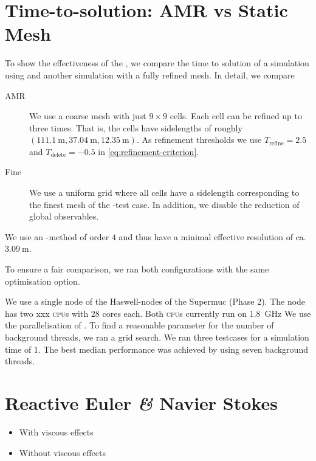 \section{Time-to-solution: AMR vs Static Mesh}
To show the effectiveness of the \amr{}, we compare the time to solution of a simulation using \amr{} and another simulation with a fully refined mesh.
In detail, we compare
\begin{description}
\item[AMR] We use a coarse mesh with just $9 \times 9$ cells.
  Each cell can be refined up to three times.
  That is, the cells have sidelengths of roughly $\left( \SI{111.1}{\m}, \SI{37.04}{\m}, \SI{12.35}{\m} \right)$.
  As refinement thresholds we use $T_\text{refine} = 2.5$ and $T_\text{delete} = -0.5$ in \cref{eq:refinement-criterion}.
\item[Fine] We use a uniform grid where all cells have a sidelength corresponding to the finest mesh of the \amr{}-test case.
  In addition, we disable the reduction of global observables.
\end{description}
We use an \aderdg{}-method of order $4$ and thus have a minimal effective resolution of ca.\ $\SI{3.09}{\m}$.

To ensure a fair comparison, we ran both configurations with the same optimisation option.

We use a single node of the Haswell-nodes of the Supermuc (Phase 2).
The node has two xxx \textsc{cpu}s with 28 cores each.
Both \textsc{cpu}s currently run on \SI{1.8}{\GHz}
We use the \tbb{} parallelisation of \exahype{}.
To find a reasonable parameter for the number of background threads, we ran a grid search.
We ran three \amr{} testcases for a simulation time of \SI{1}{\min}.
The best median performance was achieved by using seven background threads.

\section{Reactive Euler \textit{\&} Navier Stokes}
\begin{itemize}
\item With viscous effects
\item Without viscous effects  
\end{itemize}
